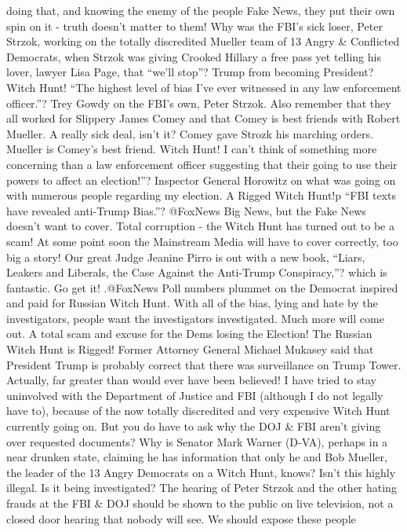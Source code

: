 doing that, and knowing the enemy of the people Fake News, they put
their own spin on it - truth doesn't matter to them! Why was the FBI's
sick loser, Peter Strzok, working on the totally discredited Mueller
team of 13 Angry \& Conflicted Democrats, when Strzok was giving Crooked
Hillary a free pass yet telling his lover, lawyer Lisa Page, that
``we'll stop''? Trump from becoming President? Witch Hunt! ``The highest
level of bias I've ever witnessed in any law enforcement officer.''?
Trey Gowdy on the FBI's own, Peter Strzok. Also remember that they all
worked for Slippery James Comey and that Comey is best friends with
Robert Mueller. A really sick deal, isn't it? Comey gave Strozk his
marching orders. Mueller is Comey's best friend. Witch Hunt! I can't
think of something more concerning than a law enforcement officer
suggesting that their going to use their powers to affect an
election!''? Inspector General Horowitz on what was going on with
numerous people regarding my election. A Rigged Witch Hunt!p ``FBI texts
have revealed anti-Trump Bias.''? @FoxNews Big News, but the Fake News
doesn't want to cover. Total corruption - the Witch Hunt has turned out
to be a scam! At some point soon the Mainstream Media will have to cover
correctly, too big a story! Our great Judge Jeanine Pirro is out with a
new book, ``Liars, Leakers and Liberals, the Case Against the Anti-Trump
Conspiracy,''? which is fantastic. Go get it! .@FoxNews Poll numbers
plummet on the Democrat inspired and paid for Russian Witch Hunt. With
all of the bias, lying and hate by the investigators, people want the
investigators investigated. Much more will come out. A total scam and
excuse for the Dems losing the Election! The Russian Witch Hunt is
Rigged! Former Attorney General Michael Mukasey said that President
Trump is probably correct that there was surveillance on Trump Tower.
Actually, far greater than would ever have been believed! I have tried
to stay uninvolved with the Department of Justice and FBI (although I do
not legally have to), because of the now totally discredited and very
expensive Witch Hunt currently going on. But you do have to ask why the
DOJ \& FBI aren't giving over requested documents? Why is Senator Mark
Warner (D-VA), perhaps in a near drunken state, claiming he has
information that only he and Bob Mueller, the leader of the 13 Angry
Democrats on a Witch Hunt, knows? Isn't this highly illegal. Is it being
investigated? The hearing of Peter Strzok and the other hating frauds at
the FBI \& DOJ should be shown to the public on live television, not a
closed door hearing that nobody will see. We should expose these people
